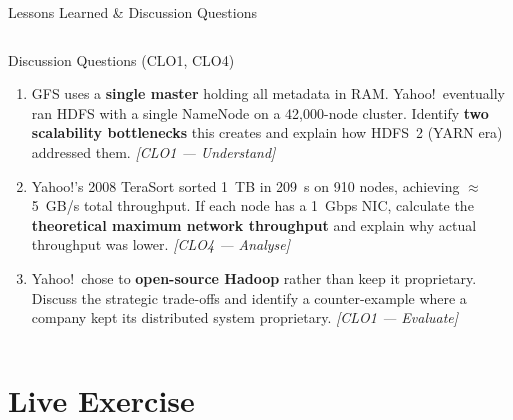 \documentclass[aspectratio=169,10pt]{beamer}
\begin{document}
\begin{frame}{Lessons Learned \& Discussion Questions}
\begin{columns}[T]
      \begin{alertblock}{Discussion Questions \textmd{\tiny (CLO1, CLO4)}}
        \begin{enumerate}
          \item GFS uses a \textbf{single master} holding all metadata
                in RAM.  Yahoo!\ eventually ran HDFS with a single
                NameNode on a 42{,}000-node cluster.
                Identify \textbf{two scalability bottlenecks} this
                creates and explain how HDFS~2 (YARN era) addressed them.
                \textit{[CLO1 — Understand]}
          \item Yahoo!'s 2008 TeraSort sorted 1~TB in 209~s on
                910 nodes, achieving $\approx$5~GB/s total throughput.
                If each node has a 1~Gbps NIC, calculate the
                \textbf{theoretical maximum network throughput} and
                explain why actual throughput was lower.
                \textit{[CLO4 — Analyse]}
          \item Yahoo!\ chose to \textbf{open-source Hadoop} rather
                than keep it proprietary.
                Discuss the strategic trade-offs and identify a
                counter-example where a company kept its distributed
                system proprietary.
                \textit{[CLO1 — Evaluate]}
        \end{enumerate}
      \end{alertblock}
  \end{columns}
\end{frame}

\section{Live Exercise}
\end{document}
